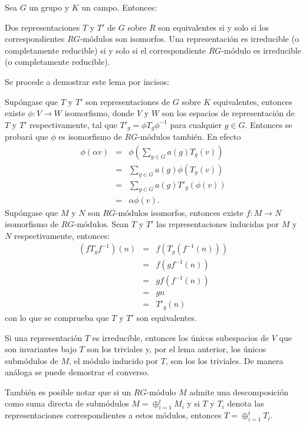   \begin{teorema}\label{teo:relacionTG}
  Sea $G$ un grupo y $K$ un campo. Entonces:
  \begin{bulletList}
  \newItem Dos representaciones $T$ y $T'$ de $G$ sobre $R$ son equivalentes si y solo si los correspondientes $RG\mbox{-módulos}$ son isomorfos.
  \newItem Una representación es irreducible (o completamente reducible) si y solo si el correspondiente $RG\mbox{-módulo}$ es irreducible (o completamente reducible).
  \end{bulletList}
  \end{teorema}
  \begin{proof*}
  Se procede a demostrar este lema por incisos:
  \begin{bulletList}
  \newItem Supóngase que $T$ y $T'$ son representaciones de $G$ sobre $K$ equivalentes, entonces existe $\phi \colon V \to W$ isomorfismo, donde $V$ y $W$ son los espacios de representación de $T$ y $T'$ respectivamente, tal que $T'_g = \phi T_g \phi^{-1}$ para cualquier $g \in G$. Entonces se probará que $\phi$ es isomorfismo de $RG\mbox{-módulos}$ también.  En efecto
  \begin{eqnarray*}
   \phi(\alpha v) &=& \phi\left( \sum_{g \in G}a(g)T_g(v) \right) \\ 
   &=&  \sum_{g \in G}a(g)\phi(T_g(v)) \\
    & =& \sum_{g \in G}a(g)T'_g(\phi(v))\\ 
    &=& \alpha \phi(v).
  \end{eqnarray*}
   \newItem Supóngase que $M$ y $N$ son $RG\mbox{-módulos}$ isomorfos, entonces existe $f \colon M \to N$ isomorfismo de $RG\mbox{-módulos}$. Sean $T$ y $T'$ las representaciones inducidas por $M$ y $N$ respectivamente, entonces:
   \begin{eqnarray*}
   (fT_gf^{-1})(n) &=& 
    f\left(T_g\left(f^{-1}(n)\right)\right)\\
    &=& f\left(gf^{-1}(n)\right) \\
    &=& gf\left(f^{-1}(n)\right) \\
    &=& gn \\
    &=& T'_g(n)
   \end{eqnarray*} con lo que se comprueba que $T$ y $T'$ son equivalentes. 
   
   \newItem Si una representación $T$ es irreducible, entonces los únicos subespacios de $V$ que son invariantes bajo $T$ son los triviales y, por el lema anterior, los únicos submódulos de $M$, el módulo inducido por $T$, son los los triviales. De manera análoga se puede demostrar el converso. \qedhere
   \end{bulletList}
  \end{proof*}
  También es posible notar que si un $RG\mbox{-módulo}$ $M$ admite una descomposición como suma directa de submódulos $M = \oplus_{i = 1}^{t}M_i$ y si $T$ y $T_i$ denota las representaciones correspondientes a estos módulos, entonces $T = \oplus_{i = 1}^tT_i$. 
 
